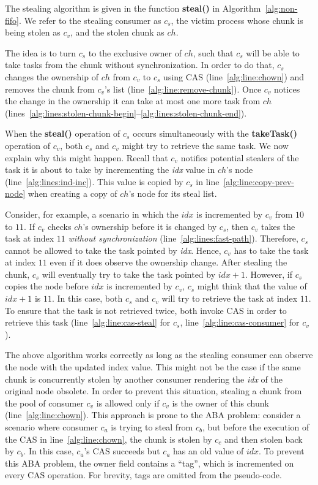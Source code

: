 \snegspace
The stealing algorithm is given in the function {\bf steal()} in Algorithm~\ref{alg:non-fifo}. 
We refer to the stealing consumer as $c_s$, the victim process whose chunk is being stolen as $c_v$, and the stolen chunk as $ch$.

The idea is to turn $c_s$ to the exclusive owner of $ch$, such that $c_s$ will be able to take tasks from the chunk without synchronization. 
In order to do that, $c_s$ changes the ownership of $ch$ from $c_v$ to $c_s$ using CAS (line~\ref{alg:line:chown}) and removes the chunk from $c_v$'s list (line~\ref{alg:line:remove-chunk}). 
Once $c_v$ notices the change in the ownership it can take at most one more task from $ch$ (lines~\ref{alg:lines:stolen-chunk-begin}--\ref{alg:lines:stolen-chunk-end}). 

When the {\bf steal()} operation of $c_s$ occurs simultaneously with the {\bf takeTask()} operation of $c_v$, both $c_s$ and $c_v$ might try to retrieve the same task. We now explain why this might happen. Recall that $c_v$ notifies potential stealers of the task it is about to take by incrementing the \emph{idx} value in $ch$'s node (line~\ref{alg:lines:ind-inc}). This value is copied by $c_s$ in line~\ref{alg:line:copy-prev-node} when creating a copy of $ch$'s node for its steal list.

Consider, for example, a scenario in which the $idx$ is incremented by $c_v$ from $10$ to $11$. 
If $c_v$ checks $ch$'s ownership before it is changed by $c_s$, then $c_v$ takes the task at index $11$ \emph{without synchronization} (line~\ref{alg:lines:fast-path}). Therefore, $c_s$ cannot be allowed to take the task pointed by \emph{idx}. Hence, $c_v$ has to take the task at index $11$ even if it does observe the ownership change. 
After stealing the chunk, $c_s$ will eventually try to take the task pointed by $idx+1$. However, if $c_s$ copies the node before $idx$ is incremented by $c_v$, $c_s$ might think that the value of $idx+1$ is $11$. In this case, both $c_s$ and $c_v$ will try to retrieve the task at index $11$. To ensure that the task is not retrieved twice, both invoke CAS in order to retrieve this task (line~\ref{alg:line:cas-steal} for $c_s$, line~\ref{alg:line:cas-consumer} for $c_v$). 

The above algorithm works correctly as long as the stealing consumer can observe the node with the updated index value. 
This might not be the case if the same chunk is concurrently stolen by another consumer rendering the \emph{idx} of the original node obsolete. 
In order to prevent this situation, stealing a chunk from the pool of consumer $c_v$ is allowed only if $c_v$ is the owner of this chunk (line~\ref{alg:line:chown}). This approach is prone to the ABA problem: consider a scenario where consumer $c_a$ is trying to steal from $c_b$, but before the execution of the CAS in line~\ref{alg:line:chown}, the chunk is stolen by $c_c$ and then stolen back by $c_b$. In this case, $c_a$'s CAS succeeds but $c_a$ has an old value of $idx$. To prevent this ABA problem, the owner field contains a ``tag'', which is incremented on every CAS operation. For brevity, tags are omitted from the pseudo-code.

